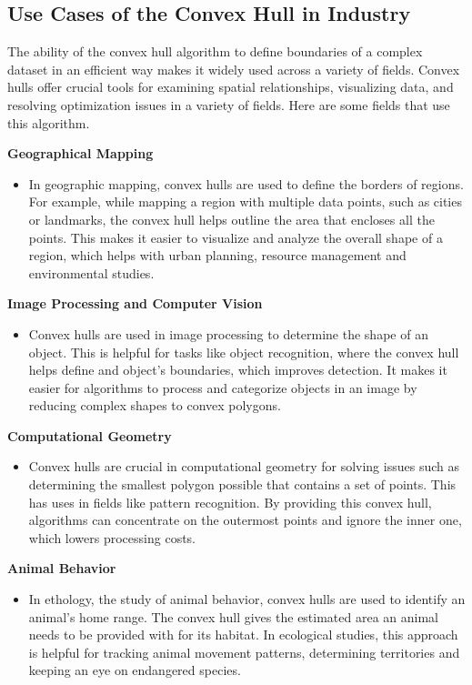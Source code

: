     \subsection{Use Cases of the Convex Hull in Industry}
    The ability of the convex hull algorithm to define boundaries of a complex dataset in an efficient way makes it widely used across a variety of fields. Convex hulls offer crucial tools for examining spatial relationships, visualizing data, and resolving optimization issues in a variety of fields. Here are some fields that use this algorithm.

    \pagebreak

    \textbf{Geographical Mapping}
    \begin{itemize}
        \item In geographic mapping, convex hulls are used to define the borders of regions. For example, while mapping a region with multiple data points, such as cities or landmarks, the convex hull helps outline the area that encloses all the points. This makes it easier to visualize and analyze the overall shape of a region, which helps with urban planning, resource management and environmental studies.
    \end{itemize}
    \textbf{Image Processing and Computer Vision}
    \begin{itemize}
        \item Convex hulls are used in image processing to determine the shape of an object. This is helpful for tasks like object recognition, where the convex hull helps define and object's boundaries, which improves detection. It makes it easier for algorithms to process and categorize objects in an image by reducing complex shapes to convex polygons.
    \end{itemize}
    \textbf{Computational Geometry}
    \begin{itemize}
        \item Convex hulls are crucial in computational geometry for solving issues such as determining the smallest polygon possible that contains a set of points. This has uses in fields like pattern recognition. By providing this convex hull, algorithms can concentrate on the outermost points and ignore the inner one,  which lowers processing costs.
    \end{itemize}
    \textbf{Animal Behavior}
    \begin{itemize}
        \item In ethology, the study of animal behavior, convex hulls are used to identify an animal's home range. The convex hull gives the estimated area an animal needs to be provided with for its habitat. In ecological studies, this approach is helpful for tracking animal movement patterns, determining territories and keeping an eye on endangered species.
    \end{itemize}
